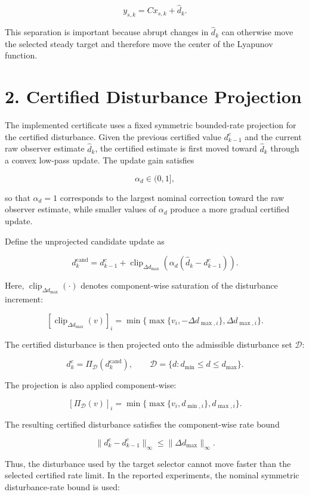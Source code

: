 \documentclass[11pt]{article}
\begin{document}
\[
y_{s,k}=C x_{s,k}+\hat d_k.
\]

This separation is important because abrupt changes in $\hat d_k$ can otherwise move the selected steady target and therefore move the center of the Lyapunov function.


\section*{2. Certified Disturbance Projection}

The implemented certificate uses a fixed symmetric bounded-rate projection for the certified disturbance. Given the previous certified value $d^c_{k-1}$ and the current raw observer estimate $\hat d_k$, the certified estimate is first moved toward $\hat d_k$ through a convex low-pass update. The update gain satisfies


\[
\alpha_d \in (0,1],
\]

so that $\alpha_d=1$ corresponds to the largest nominal correction toward the raw observer estimate, while smaller values of $\alpha_d$ produce a more gradual certified update.


Define the unprojected candidate update as


\[
d^{\mathrm{cand}}_k
=
d^c_{k-1}
+
\operatorname{clip}_{\Delta d_{\max}}
\left(
\alpha_d(\hat d_k-d^c_{k-1})
\right).
\]

Here, $\operatorname{clip}_{\Delta d_{\max}}(\cdot)$ denotes component-wise saturation of the disturbance increment:


\[
\left[
\operatorname{clip}_{\Delta d_{\max}}(v)
\right]_i
=
\min\{\max\{v_i,-\Delta d_{\max,i}\},\Delta d_{\max,i}\}.
\]

The certified disturbance is then projected onto the admissible disturbance set $\mathcal D$:


\[
d^c_k = \Pi_{\mathcal D}\left(d^{\mathrm{cand}}_k\right),
\qquad
\mathcal D = \{d: d_{\min}\le d\le d_{\max}\}.
\]

The projection is also applied component-wise:


\[
\left[\Pi_{\mathcal D}(v)\right]_i
=
\min\{\max\{v_i,d_{\min,i}\},d_{\max,i}\}.
\]

The resulting certified disturbance satisfies the component-wise rate bound


\[
\|d^c_k-d^c_{k-1}\|_\infty
\le
\|\Delta d_{\max}\|_\infty.
\]

Thus, the disturbance used by the target selector cannot move faster than the selected certified rate limit. In the reported experiments, the nominal symmetric disturbance-rate bound is used:
\end{document}
